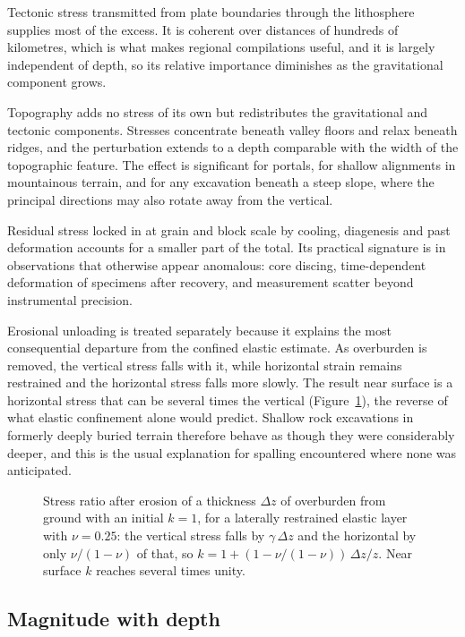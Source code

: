 Tectonic stress transmitted from plate boundaries through the lithosphere
supplies most of the excess. It is coherent over distances of hundreds of
kilometres, which is what makes regional compilations useful, and it is
largely independent of depth, so its relative importance diminishes as the
gravitational component grows.

Topography adds no stress of its own but redistributes the gravitational and
tectonic components. Stresses concentrate beneath valley
floors and relax beneath ridges, and the perturbation extends to a depth
comparable with the width of the topographic feature. The effect is
significant for portals, for shallow alignments in mountainous terrain, and for any excavation
beneath a steep slope, where the principal directions may also rotate away
from the vertical.

Residual stress locked in at grain and block scale by cooling, diagenesis and
past deformation accounts for a smaller part of the total. Its practical
signature is in observations that otherwise appear anomalous: core discing,
time-dependent deformation of specimens after recovery, and measurement
scatter beyond instrumental precision.

Erosional unloading is treated separately because it explains the
most consequential departure from the confined elastic estimate. As overburden is
removed, the vertical stress falls with it, while horizontal strain remains
restrained and the horizontal stress falls more slowly. The result near
surface is a horizontal stress that can be several times the vertical
(Figure~\ref{fig:erosion-unloading}), the
reverse of what elastic confinement alone would predict. Shallow rock
excavations in formerly deeply buried terrain therefore behave as though they
were considerably deeper, and this is the usual explanation for spalling
encountered where none was anticipated.

\begin{figure}[htbp]
\centering
{}
\caption{Stress ratio after erosion of a thickness $\Delta z$ of overburden from ground with an initial $k = 1$, for a laterally restrained elastic layer with $\nu = 0.25$: the vertical stress falls by $\gamma\,\Delta z$ and the horizontal by only $\nu/(1-\nu)$ of that, so $k = 1 + (1 - \nu/(1-\nu))\,\Delta z/z$. Near surface $k$ reaches several times unity.}
\label{fig:erosion-unloading}
\end{figure}

\subsection{Magnitude with depth}
\label{sec:k-ratio}


